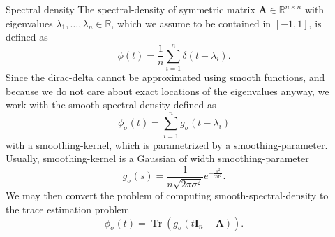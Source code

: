\documentclass[final, 12pt]{beamer}
\newcommand{\mtx}[1]{\boldsymbol{#1}}
\DeclareMathOperator{\Tr}{Tr}
\begin{document}
\begin{frame}[t]
\begin{columns}[t]
\begin{column}{0.45\paperwidth}
        \begin{block}{Spectral density}
            The \gls{spectral-density} of symmetric matrix $\mtx{A} \in \mathbb{R}^{n \times n}$
            with eigenvalues $\lambda_1, \dots, \lambda_n \in \mathbb{R}$, which
            we assume to be contained in $[-1, 1]$,
            is defined as
            \begin{equation}
                \phi(t) = \frac{1}{n} \sum_{i=1}^n \delta(t - \lambda_i).
            \end{equation}
            Since the \gls{dirac-delta} cannot be approximated using smooth functions,
            and because we do not care about exact locations of the eigenvalues anyway,
            we work with the \gls{smooth-spectral-density} defined as
            \begin{equation}
                \phi_{\sigma}(t) = \sum_{i=1}^n g_{\sigma}(t - \lambda_i)
            \end{equation}
            with a \gls{smoothing-kernel}, which is parametrized by a \gls{smoothing-parameter}.
            Usually, \gls{smoothing-kernel} is a Gaussian of width \gls{smoothing-parameter}
            \begin{equation}
                g_{\sigma}(s) = \frac{1}{n \sqrt{2 \pi \sigma^2}} e^{-\frac{s^2}{2\sigma^2}}.
            \end{equation}
            We may then convert the problem of computing \gls{smooth-spectral-density}
            to the trace estimation problem
            \begin{equation}
                \phi_{\sigma}(t) = \Tr(g_{\sigma}(t \mtx{I}_n - \mtx{A})).
            \end{equation}
        \end{block}

    \end{column}

    \begin{column}{0.45\paperwidth}


\end{column}
\end{columns}
\end{frame}
\end{document}
